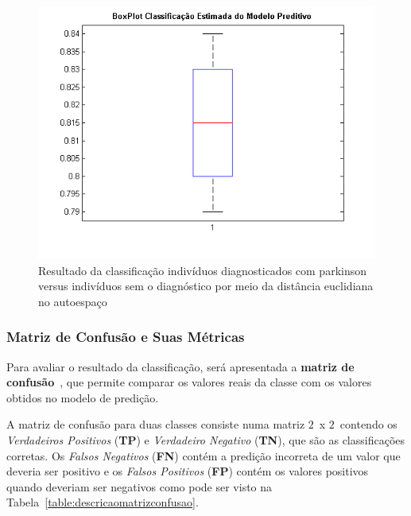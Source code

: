 \begin{figure}
 \centering
 \includegraphics[scale=0.6]{./img/boxplot-eigengaits-parkinsondatabase.png}
\caption{Resultado da classificação indivíduos diagnosticados com parkinson versus indivíduos sem o diagnóstico por meio da distância euclidiana no autoespaço}
 \label{fig:classificacaopca}
\end{figure}

\subsubsection{Matriz de Confusão e Suas Métricas}
Para avaliar o resultado da classificação, será apresentada a \textbf{matriz de confusão}~\cite{datamining2005}, que permite comparar os valores reais da classe com os valores obtidos no modelo de predição. 

A matriz de confusão para duas classes consiste numa matriz $2$\ x $2$\, contendo os \textit{Verdadeiros Positivos} (\textbf{TP}) e \textit{Verdadeiro Negativo} (\textbf{TN}), que são as classificações corretas. Os \textit{Falsos Negativos} (\textbf{FN}) contém a predição incorreta de um valor que deveria ser positivo e os \textit{Falsos Positivos} (\textbf{FP}) contém os valores positivos quando deveriam ser negativos como pode ser visto na Tabela~\ref{table:descricaomatrizconfusao}.


